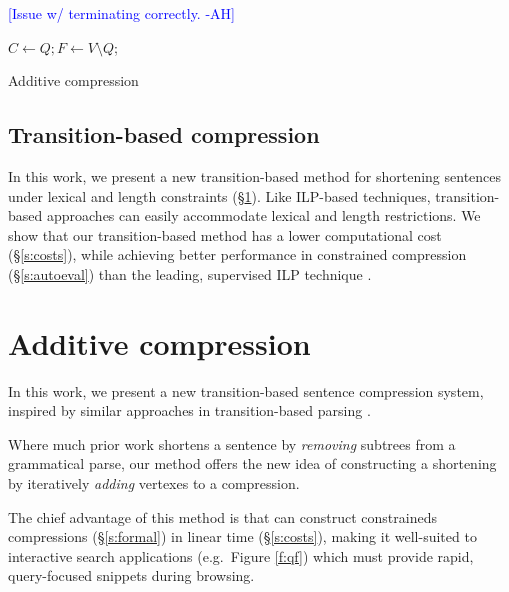 \documentclass[11pt,a4paper]{article}
\newcommand{\ahcomment}[1]{\textcolor{blue}{[#1 -AH]}}
\begin{document}
\ahcomment{Issue w/ terminating correctly.}
\begin{algorithm}[]
\SetAlgoLined
{}
 $ C \gets Q;  F \gets V \setminus Q$; \\
 \caption{Additive compression}
\end{algorithm}


\subsection{Transition-based compression}

In this work, we present a new transition-based method for shortening sentences under lexical and length constraints (\S\ref{s:system}). Like ILP-based techniques, transition-based approaches can easily accommodate lexical and length restrictions. We show that our transition-based method has a lower computational cost (\S\ref{s:costs}), while achieving better performance in constrained compression (\S\ref{s:autoeval}) than the leading, supervised ILP technique \cite{filippova2013overcoming}.

\section{Additive compression}\label{s:system}

In this work, we present a new transition-based sentence compression system, inspired by similar approaches in transition-based parsing \cite{nivre2003,D14-1082}. 

Where much prior work \cite{Jing2000SentenceRF,Knight2000StatisticsBasedS,berg2011jointly,almeida2013fast,filippova2015sentence}
shortens a sentence by \textit{removing} subtrees from a grammatical parse, our method offers the new idea of constructing a shortening by iteratively \textit{adding} vertexes to a compression. 

The chief advantage of this method is that can construct constraineds compressions (\S\ref{s:formal}) in linear time (\S\ref{s:costs}), making it well-suited to interactive search applications (e.g.~Figure \ref{f:qf}) which must provide rapid, query-focused snippets during browsing.
\end{document}
